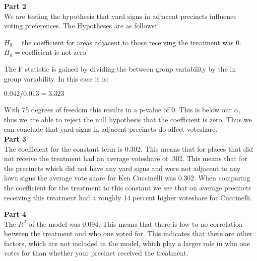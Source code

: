 \documentclass{article}
\begin{document}
\vspace{10mm}
\textbf{\large Part 2\\}
We are testing the hypothesis that yard signs in adjacent precincts influence voting preferences. The Hypotheses are as follows:
\begin{center}
	$H_{0} = $the coefficient for areas adjacent to those receiving the treatment was 0.\\
	$H_{a} = $coefficient is not zero.\\
\end{center}
The F statistic is gained by dividing the between group variability by the in group variability. In this case it is:
\begin{center}
	$0.042/0.013 = 3.323$
\end{center}
With 75 degrees of freedom this results in a p-value of 0. This is below our $\alpha$, thus we are able to reject the null hypothesis that the coefficient is zero. Thus we can conclude that yard signs in adjacent precincts do affect voteshare.\\
	
\vspace{10mm}
\textbf{\large Part 3\\}	
The coefficient for the constant term is 0.302. This means that for places that did not receive the treatment had an average voteshare of .302. This means that for the precincts which did not have any yard signs and were not adjacent to any lawn signs the average vote share for Ken Cuccinelli was 0.302. When comparing the coefficient for the treatment to this constant we see that on average precincts receiving this treatment had a roughly 14 percent higher voteshare for Cuccinelli.
	
\vspace{10mm}
\textbf{\large Part 4\\}	
The $R^{2}$ of the model was 0.094. This means that there is low to no correlation between the treatment and who one voted for. This indicates that there are other factors, which are not included in the model, which play a larger role in who one votes for than whether your precinct received the treatment. 
\end{document}

